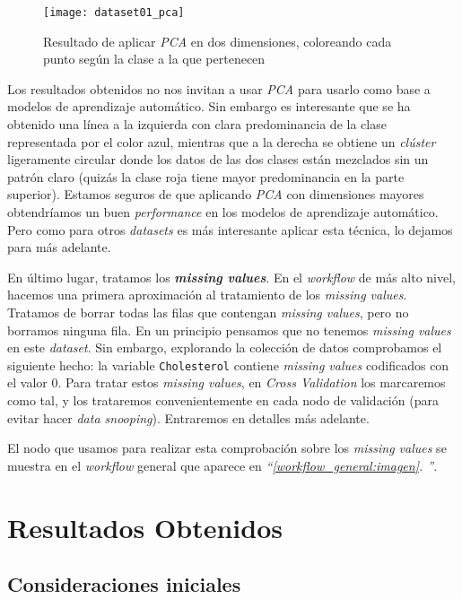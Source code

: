 \documentclass[11pt]{article}
\newcommand{\customcite}[1]{\emph{``\ref{#1}. \nameref{#1}''}}
\begin{document}
\begin{figure}[H]
    \centering
    \texttt{[image: dataset01\_pca]}
    \caption{Resultado de aplicar \emph{PCA} en dos dimensiones, coloreando cada punto según la clase a la que pertenecen}
\end{figure}

Los resultados obtenidos no nos invitan a usar \emph{PCA} para usarlo como base a modelos de aprendizaje automático. Sin embargo es interesante que se ha obtenido una línea a la izquierda con clara predominancia de la clase representada por el color azul, mientras que a la derecha se obtiene un \emph{clúster} ligeramente circular donde los datos de las dos clases están mezclados sin un patrón claro (quizás la clase roja tiene mayor predominancia en la parte superior). Estamos seguros de que aplicando \emph{PCA} con dimensiones mayores obtendríamos un buen \emph{performance} en los modelos de aprendizaje automático. Pero como para otros \emph{datasets} es más interesante aplicar esta técnica, lo dejamos para más adelante.

En último lugar, tratamos los \textbf{\emph{missing values}}. En el \emph{workflow} de más alto nivel, hacemos una primera aproximación al tratamiento de los \emph{missing values}. Tratamos de borrar todas las filas que contengan \emph{missing values}, pero no borramos ninguna fila. En un principio pensamos que no tenemos \emph{missing values} en este \emph{dataset}. Sin embargo, explorando la colección de datos comprobamos el siguiente hecho: la variable \lstinline{Cholesterol} contiene \emph{missing values} codificados con el valor $0$. Para tratar estos \emph{missing values}, en \emph{Cross Validation} los marcaremos como tal, y los trataremos convenientemente en cada nodo de validación (para evitar hacer \emph{data snooping}). Entraremos en detalles más adelante.

El nodo que usamos para realizar esta comprobación sobre los \emph{missing values} se muestra en el \emph{workflow} general que aparece en \customcite{workflow_general:imagen}.

\pagebreak

\section{Resultados Obtenidos} \label{resultados_brutos:seccion}

\subsection{Consideraciones iniciales} \label{cv_consideraciones:seccion}
\end{document}
